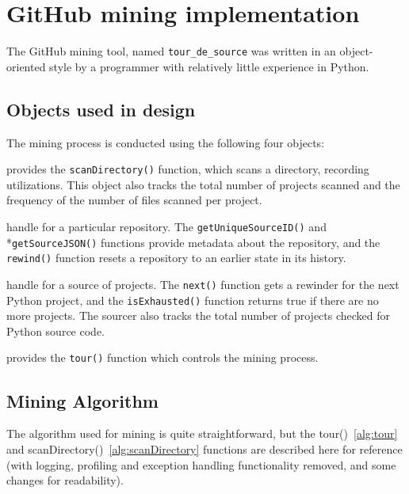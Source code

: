 \section*{GitHub mining implementation}
\label{app:miningImplementation}

The GitHub mining tool, named {\tt tour\_de\_source} was written in an object-oriented style by a programmer with relatively little experience in Python.

\subsection*{Objects used in design}
The mining process is conducted using the following four objects:
\begin{description} \itemsep -1pt
\item[Scanner] provides the {\tt scanDirectory()} function, which scans a directory, recording utilizations.  This object also tracks the total number of projects scanned and the frequency of the number of files scanned per project.
\item[Rewinder] handle for a particular repository. The {\tt getUniqueSourceID()} and \\*{\tt getSourceJSON()} functions provide metadata about the repository, and the {\tt rewind()} function resets a repository to an earlier state in its history.
\item[Sourcer] handle for a source of projects.  The {\tt next()} function gets a rewinder for the next Python project, and the {\tt isExhausted()} function returns true if there are no more projects.  The sourcer also tracks the total number of projects checked for Python source code.
\item[Tourist] provides the {\tt tour()} function which controls the mining process.
\end{description}

\subsection*{Mining Algorithm}
The algorithm used for mining is quite straightforward, but the tour()~\ref{alg:tour} and scanDirectory()~\ref{alg:scanDirectory} functions are described here for reference (with logging, profiling and exception handling functionality removed, and some changes for readability).


